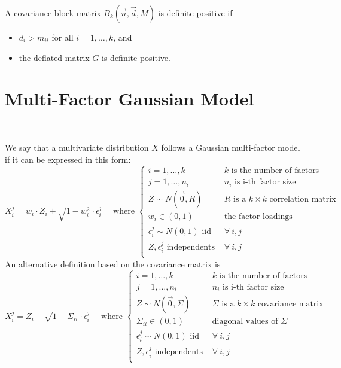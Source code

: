 \documentclass[11pt,fleqn]{book} %
\begin{document}
\begin{corollary}
	A covariance block matrix $B_k(\vec{n},\vec{d},M)$ is definite-positive if
	\begin{itemize}
		\item $d_i > m_{ii}$ for all $i=1,\dots,k$, and
		\item the deflated matrix $G$ is definite-positive.
	\end{itemize}
\end{corollary}

\section{Multi-Factor Gaussian Model}
\label{ap:mfgm}
~\\
\begin{definition}
	\label{def:gmfm}
	We say that a multivariate distribution $X$ follows a Gaussian multi-factor
	model if it can be expressed in this form:
	\begin{displaymath}
		X_i^j = w_i \cdot Z_i + \sqrt{1-w_i^2} \cdot \epsilon_i^j
		\quad \text{ where } \left\{
		\begin{array}{ll}
			i = 1, \dots, k & \text{$k$ is the number of factors} \\
			j = 1, \dots, n_i & \text{$n_i$ is i-th factor size} \\
			Z \sim N(\vec{0},R) & \text{$R$ is a $k {\times} k$ correlation matrix} \\
			w_i \in (0,1) & \text{the factor loadings } \\
			\epsilon_i^j \sim N(0,1) \text { iid } & \forall\ i,j \\
			Z, \epsilon_i^j \text{ independents } & \forall\ i,j \\
		\end{array}
		\right.
	\end{displaymath}
	An alternative definition based on the covariance matrix is
	\begin{displaymath}
		X_i^j = Z_i + \sqrt{1-\Sigma_{ii}} \cdot \epsilon_i^j
		\quad \text{ where } \left\{
		\begin{array}{ll}
			i = 1, \dots, k & \text{$k$ is the number of factors} \\
			j = 1, \dots, n_i & \text{$n_i$ is i-th factor size} \\
			Z \sim N(\vec{0},\Sigma) & \text{$\Sigma$ is a $k {\times} k$ covariance matrix} \\
			\Sigma_{ii} \in (0,1) & \text{diagonal values of $\Sigma$} \\
			\epsilon_i^j \sim N(0,1) \text { iid } & \forall\ i,j \\
			Z, \epsilon_i^j \text{ independents } & \forall\ i,j \\
		\end{array}
		\right.
	\end{displaymath}
\end{definition}
\end{document}

